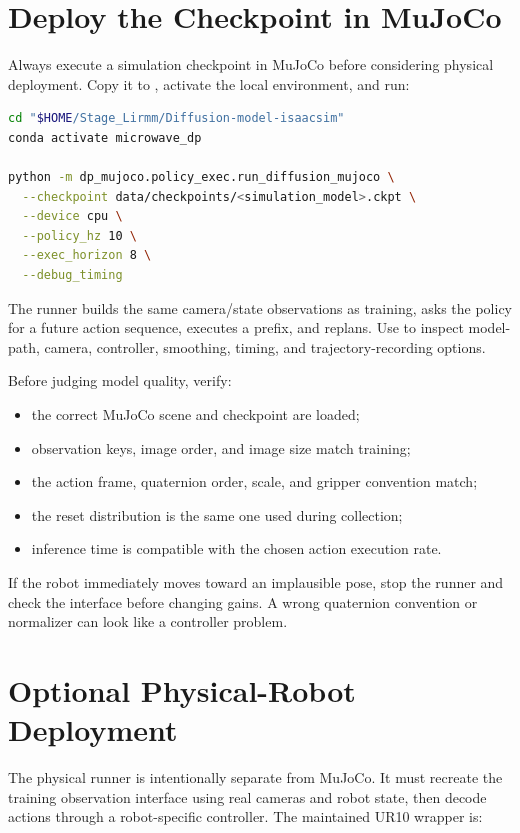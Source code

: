 \section{Deploy the Checkpoint in MuJoCo}
\label{chap:deployment}

Always execute a simulation checkpoint in MuJoCo before considering physical
deployment. Copy it to , activate the local
environment, and run:

\begin{lstlisting}[language=bash]
cd "$HOME/Stage_Lirmm/Diffusion-model-isaacsim"
conda activate microwave_dp

python -m dp_mujoco.policy_exec.run_diffusion_mujoco \
  --checkpoint data/checkpoints/<simulation_model>.ckpt \
  --device cpu \
  --policy_hz 10 \
  --exec_horizon 8 \
  --debug_timing
\end{lstlisting}

The runner builds the same camera/state observations as training, asks the
policy for a future action sequence, executes a prefix, and replans. Use
\filepath{--help} to inspect model-path, camera, controller, smoothing, timing,
and trajectory-recording options.

Before judging model quality, verify:

\begin{itemize}
  \item the correct MuJoCo scene and checkpoint are loaded;
  \item observation keys, image order, and image size match training;
  \item the action frame, quaternion order, scale, and gripper convention match;
  \item the reset distribution is the same one used during collection;
  \item inference time is compatible with the chosen action execution rate.
\end{itemize}

If the robot immediately moves toward an implausible pose, stop the runner and
check the interface before changing gains. A wrong quaternion convention or
normalizer can look like a controller problem.

\section{Optional Physical-Robot Deployment}
\label{sec:physical-deployment}

The physical runner is intentionally separate from MuJoCo. It must recreate the
training observation interface using real cameras and robot state, then decode
actions through a robot-specific controller. The maintained UR10 wrapper is:

